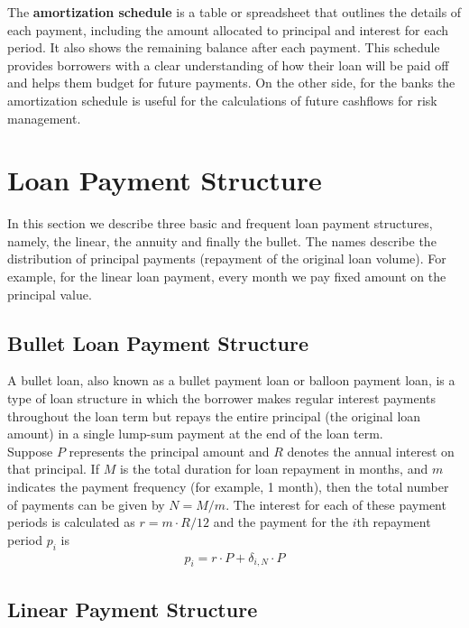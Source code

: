 \documentclass[11pt]{report}
\begin{document}
The \textbf{amortization schedule} is a table or spreadsheet that outlines the details of each payment, including the amount allocated to principal and interest for each period. It also shows the remaining balance after each payment. This schedule provides borrowers with a clear understanding of how their loan will be paid off and helps them budget for future payments. On the other side, for the banks the amortization schedule is useful for the calculations of future cashflows for risk management.

\section{Loan Payment Structure}

In this section we describe three basic and frequent loan payment structures, namely, the linear, the annuity and finally the bullet. The names describe the distribution of principal payments (repayment of the original loan volume). For example, for the linear loan payment, every month we pay fixed amount on the principal value. 


\subsection{Bullet Loan Payment Structure}

A bullet loan, also known as a bullet payment loan or balloon payment loan, is a type of loan structure in which the borrower makes regular interest payments throughout the loan term but repays the entire principal (the original loan amount) in a single lump-sum payment at the end of the loan term.\\

Suppose $P$ represents the principal amount and $R$ denotes the annual interest on that principal. If $M$ is the total duration for loan repayment in months, and $m$ indicates the payment frequency (for example, 1 month), then the total number of payments can be given by $N=M/m$. The interest for each of these payment periods is calculated as $r = m \cdot R/12$ and the payment for the $i$th repayment period $p_i$ is
\begin{align}
	p_i =r\cdot P+\delta_{i,N}\cdot P
\end{align}

\subsection{Linear Payment Structure}
\end{document}
